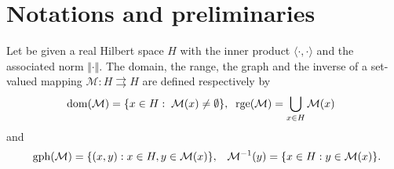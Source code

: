 \documentclass[11pt]{article}
\def\beq{\begin{equation}}
\def\eeq{\end{equation}}
\theoremstyle{plain}
\begin{document}
\section{Notations and preliminaries} \label{sec2}
Let  be  given  a {real} Hilbert space  $H$ with {the inner product $\langle \cdot,\cdot \rangle$ and the associated norm $\Vert \cdot \Vert$.}  
\noindent The domain, the range, the graph and the inverse of a set-valued mapping $\mathcal{M}: {H}\rightrightarrows {H}$ are defined respectively by
$${\rm dom}(\mathcal{M})=\{x\in {H}:\;\mathcal{M}(x)\neq \emptyset\},\;\;{\rm rge}(\mathcal{M})=\displaystyle\bigcup_{x\in{H}}\mathcal{M}(x)\;\;$$
 and
 $$\;\;{\rm gph}(\mathcal{M})=\{(x,y): x\in{H}, y\in \mathcal{M}(x)\},\;\;\;\mathcal{M}^{-1}(y)=\{ x\in H: y\in \mathcal{M}(x) \}.$$
\end{document}
